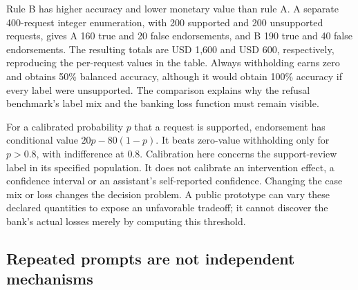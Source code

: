 Rule B has higher accuracy and lower monetary value than rule A. A separate
400-request integer enumeration, with 200 supported and 200 unsupported
requests, gives A 160 true and 20 false endorsements, and B 190 true and 40
false endorsements. The resulting totals are USD 1,600 and USD 600,
respectively, reproducing the per-request values in the table. Always
withholding earns zero and obtains 50\% balanced accuracy, although it would
obtain 100\% accuracy if every label were unsupported. The comparison explains
why the refusal benchmark's label mix and the banking loss function must
remain visible.
\citep{exec17_benchmark_exact}

For a calibrated probability $p$ that a request is supported, endorsement has
conditional value $20p-80(1-p)$. It beats zero-value withholding only for
$p>0.8$, with indifference at 0.8. Calibration here concerns the support-review
label in its specified population. It does not calibrate an intervention
effect, a confidence interval or an assistant's self-reported confidence.
Changing the case mix or loss changes the decision problem. A public prototype
can vary these declared quantities to expose an unfavorable tradeoff; it
cannot discover the bank's actual losses merely by computing this threshold.
\citep{exec17_benchmark_exact}

\subsection{Repeated prompts are not independent mechanisms}

